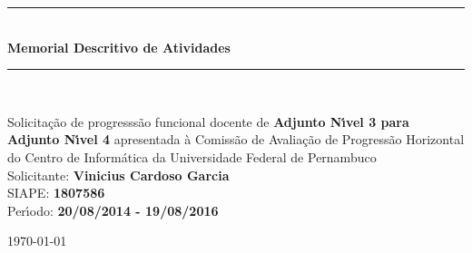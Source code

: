 \documentclass[a4paper,oneside,10pt]{article}
\begin{document}
\begin{titlepage}

\vspace{-5.0cm}

\begin{figure}[!htb]
 \label{fig:UFPE_logo}
\end{figure}

\begin{center}
\vspace{1cm}
\rule{1.0\textwidth}{1pt} \\ [0.5cm]
{\Huge \textbf{\textsf{Memorial Descritivo de Atividades}}} \\
\rule{1.0\textwidth}{1pt} \\
\vspace{2cm}

\doublespacing
{\Large \textsf{Solicita\c{c}\~{a}o de progresss\~{a}o funcional docente de \textbf{Adjunto N\'{\i}vel 3 para Adjunto N\'{\i}vel 4} apresentada \`{a} Comiss\~{a}o de Avalia\c{c}\~{a}o de Progress\~{a}o Horizontal do Centro de Inform\'{a}tica da Universidade Federal de Pernambuco}}\\
\vspace{1.5cm}
{\LARGE \textsf{Solicitante: \textbf{Vinicius Cardoso Garcia}}}\\
\vspace{0.5cm}
{\Large \textsf{SIAPE: \textbf{1807586}}} \\
\vspace{0.5cm}
{\Large \textsf{Per\'{\i}odo: \textbf{20/08/2014 - 19/08/2016}}} \\

\vspace{2.0cm}

\normalsize \textsf{\today}

\end{center}
\thispagestyle{empty}
\end{titlepage}

\tableofcontents
\end{document}
